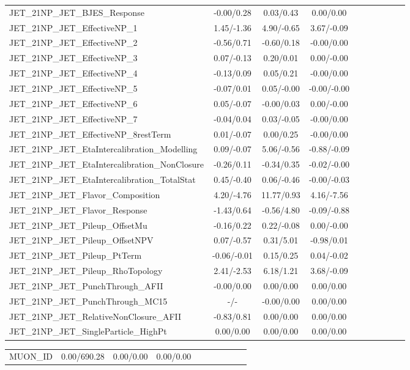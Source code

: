 \begin{table}[h]
\begin{center}
\begin{tabular}{l|ccccccccc}
JET\_21NP\_JET\_BJES\_Response &-0.00/0.28 &0.03/0.43 &0.00/0.00 \\
JET\_21NP\_JET\_EffectiveNP\_1 &1.45/-1.36 &4.90/-0.65 &3.67/-0.09 \\
JET\_21NP\_JET\_EffectiveNP\_2 &-0.56/0.71 &-0.60/0.18 &-0.00/0.00 \\
JET\_21NP\_JET\_EffectiveNP\_3 &0.07/-0.13 &0.20/0.01 &0.00/-0.00 \\
JET\_21NP\_JET\_EffectiveNP\_4 &-0.13/0.09 &0.05/0.21 &-0.00/0.00 \\
JET\_21NP\_JET\_EffectiveNP\_5 &-0.07/0.01 &0.05/-0.00 &-0.00/-0.00 \\
JET\_21NP\_JET\_EffectiveNP\_6 &0.05/-0.07 &-0.00/0.03 &0.00/-0.00 \\
JET\_21NP\_JET\_EffectiveNP\_7 &-0.04/0.04 &0.03/-0.05 &-0.00/0.00 \\
JET\_21NP\_JET\_EffectiveNP\_8restTerm &0.01/-0.07 &0.00/0.25 &-0.00/0.00 \\
JET\_21NP\_JET\_EtaIntercalibration\_Modelling &0.09/-0.07 &5.06/-0.56 &-0.88/-0.09 \\
JET\_21NP\_JET\_EtaIntercalibration\_NonClosure &-0.26/0.11 &-0.34/0.35 &-0.02/-0.00 \\
JET\_21NP\_JET\_EtaIntercalibration\_TotalStat &0.45/-0.40 &0.06/-0.46 &-0.00/-0.03 \\
JET\_21NP\_JET\_Flavor\_Composition &4.20/-4.76 &11.77/0.93 &4.16/-7.56 \\
JET\_21NP\_JET\_Flavor\_Response &-1.43/0.64 &-0.56/4.80 &-0.09/-0.88 \\
JET\_21NP\_JET\_Pileup\_OffsetMu &-0.16/0.22 &0.22/-0.08 &0.00/-0.00 \\
JET\_21NP\_JET\_Pileup\_OffsetNPV &0.07/-0.57 &0.31/5.01 &-0.98/0.01 \\
JET\_21NP\_JET\_Pileup\_PtTerm &-0.06/-0.01 &0.15/0.25 &0.04/-0.02 \\
JET\_21NP\_JET\_Pileup\_RhoTopology &2.41/-2.53 &6.18/1.21 &3.68/-0.09 \\
JET\_21NP\_JET\_PunchThrough\_AFII &-0.00/0.00 &0.00/0.00 &0.00/0.00 \\
JET\_21NP\_JET\_PunchThrough\_MC15 &-/- &-0.00/0.00 &0.00/0.00 \\
JET\_21NP\_JET\_RelativeNonClosure\_AFII &-0.83/0.81 &0.00/0.00 &0.00/0.00 \\
JET\_21NP\_JET\_SingleParticle\_HighPt &0.00/0.00 &0.00/0.00 &0.00/0.00 \\
\hline \end{tabular} \end{center} \end{table} \begin{table}[h] \scriptsize \begin{center} \begin{tabular}{l|ccccccccc} \hline MUON\_ID &0.00/690.28 &0.00/0.00 &0.00/0.00 \\

\end{tabular}
\end{center}
\end{table}
